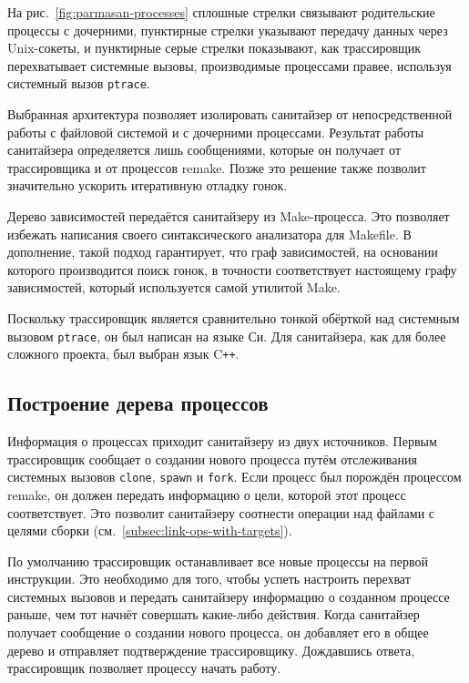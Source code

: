 На рис.~\ref{fig:parmasan-processes} сплошные стрелки связывают родительские процессы с дочерними, пунктирные стрелки указывают передачу данных через Unix-сокеты, и пунктирные серые стрелки показывают, как трассировщик перехватывает системные вызовы, производимые процессами правее, используя системный вызов \texttt{ptrace}.

Выбранная архитектура позволяет изолировать санитайзер от непосредственной работы с файловой системой и с дочерними процессами. Результат работы санитайзера определяется лишь сообщениями, которые он получает от трассировщика и от процессов remake. Позже это решение также позволит значительно ускорить итеративную отладку гонок.

Дерево зависимостей передаётся санитайзеру из Make-процесса. Это позволяет избежать написания своего синтаксического анализатора для Makefile. В дополнение, такой подход гарантирует, что граф зависимостей, на основании которого производится поиск гонок, в точности соответствует настоящему графу зависимостей, который используется самой утилитой Make.

Поскольку трассировщик является сравнительно тонкой обёрткой над системным вызовом \texttt{ptrace}, он был написан на языке Си. Для санитайзера, как для более сложного проекта, был выбран язык C\texttt{++}.

\subsection{Построение дерева процессов}

Информация о процессах приходит санитайзеру из двух источников. Первым трассировщик сообщает о создании нового процесса путём отслеживания системных вызовов \texttt{clone}, \texttt{spawn} и \texttt{fork}. Если процесс был порождён процессом remake, он должен передать информацию о цели, которой этот процесс соответствует. Это позволит санитайзеру соотнести операции над файлами с целями сборки (см.~\ref{subsec:link-ops-with-targets}).

По умолчанию трассировщик останавливает все новые процессы на первой инструкции. Это необходимо для того, чтобы успеть настроить перехват системных вызовов и передать санитайзеру информацию о созданном процессе раньше, чем тот начнёт совершать какие-либо действия. Когда санитайзер получает сообщение о создании нового процесса, он добавляет его в общее дерево и отправляет подтверждение трассировщику. Дождавшись ответа, трассировщик позволяет процессу начать работу.

